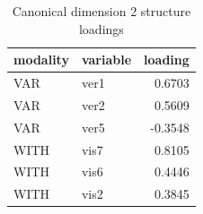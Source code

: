 \begin{table}
\caption{Canonical dimension 2 structure loadings}
\label{tab:cca_dimension_2_loadings}
\begin{tabular}{llr}
\toprule
modality & variable & loading \\
\midrule
VAR & ver1 & 0.6703 \\
VAR & ver2 & 0.5609 \\
VAR & ver5 & -0.3548 \\
WITH & vis7 & 0.8105 \\
WITH & vis6 & 0.4446 \\
WITH & vis2 & 0.3845 \\
\bottomrule
\end{tabular}
\end{table}
